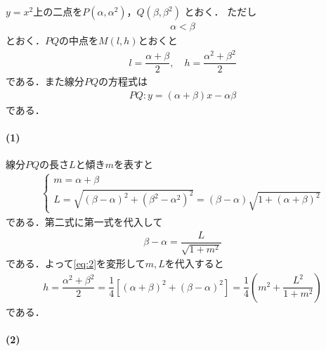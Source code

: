 \documentclass[../../main.tex]{subfiles}
\begin{document}
$y=x^2$上の二点を$P(\alpha,\alpha^2)$，$Q(\beta,\beta^2)$ とおく．
ただし
\begin{align}
  \alpha<\beta \label{eq:1}
\end{align}
とおく．$PQ$の中点を$M(l,h)$とおくと
\begin{align}
  l = \dfrac{\alpha+\beta}{2}, \quad h = \dfrac{\alpha^2+\beta^2}{2} \label{eq:2}
\end{align}
である．また線分$PQ$の方程式は
\begin{align}
  PQ:y=(\alpha+\beta)x-\alpha\beta \label{eq:3}
\end{align}
である．

\paragraph{(1)}

線分$PQ$の長さ$L$と傾き$m$を表すと
\begin{align}
  \begin{cases}
    m=\alpha+\beta\\
    L=\sqrt{(\beta-\alpha)^2+(\beta^2-\alpha^2)^2}
    =(\beta-\alpha)\sqrt{1+(\alpha+\beta)^2}
  \end{cases} \label{eq:4}
\end{align}
である．第二式に第一式を代入して
\begin{align}
  \beta-\alpha = \dfrac{L}{\sqrt{1+m^2}}
\end{align}
である．よって\cref{eq:2}を変形して$m,L$を代入すると
\begin{align}
  h = \dfrac{\alpha^2+\beta^2}{2}
  =\dfrac{1}{4}\left[(\alpha+\beta)^2+(\beta-\alpha)^2\right]
  =\dfrac{1}{4}\left(m^2+\dfrac{L^2}{1+m^2}\right) \label{eq:5}
\end{align}
である．

\paragraph{(2)}
\end{document}
